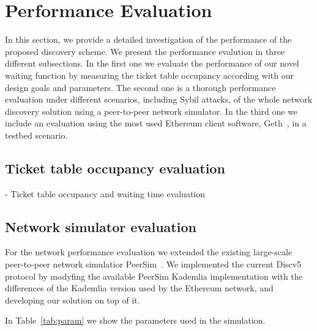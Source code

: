 
\section{Performance Evaluation}\label{sec:eval}

In  this  section,  we  provide  a  detailed  investigation  of  the performance of the proposed discovery scheme.
We present the performance evalution in three different subsections. 
In the first one we evaluate the performance of our novel waiting function by measuring the ticket table occupancy
according with our design goals and parameters.
The second one is a thorough performance evaluation under different scenarios, including Sybil attacks, of the whole network discovery solution using a peer-to-peer network simulator.
In the third one we include an evaluation using the most used Ethereum client software, Geth~\cite{go-ethereum}, in a testbed scenario.

\subsection{Ticket table occupancy evaluation}

- Ticket table occupancy  and waiting time evaluation

\subsection{Network simulator evaluation}



For the network performance evaluation we extended the existing 
large-scale peer-to-peer network simulatior PeerSim~\cite{p2p09-peersim}.
We implemented the current Discv5 protocol by modyfing the available PeerSim Kademlia implementation with the differences of the Kademlia version used by the Ethereum network, and developing our solution on top of it.

In Table~\ref{tab:param} we show the parameters used in the simulation. 

